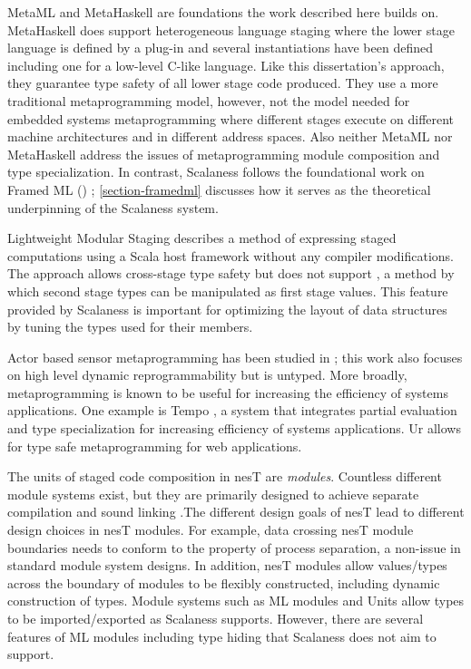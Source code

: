 MetaML \cite{Taha-MetaML,DBLP:conf/icess/Taha04} and MetaHaskell \cite{mainland12} are
foundations the work described here builds on. MetaHaskell does support heterogeneous language
staging where the lower stage language is defined by a plug-in and several instantiations have
been defined including one for a low-level C-like language. Like this dissertation's approach,
they guarantee type safety of all lower stage code produced. They use a more traditional
metaprogramming model, however, not the  model needed for embedded
systems metaprogramming where different stages execute on different machine architectures and in
different address spaces. Also neither MetaML nor MetaHaskell address the issues of
metaprogramming module composition and type specialization. In contrast, Scalaness follows the
foundational work on Framed ML (\fml) \cite{FramedML}; \autoref{section-framedml} discusses how
it serves as the theoretical underpinning of the Scalaness system.

Lightweight Modular Staging \cite{Rompf-LMS} describes a method of expressing staged
computations using a Scala host framework without any compiler modifications. The approach
allows cross-stage type safety but does not support , a
method by which second stage types can be manipulated as first stage values. This feature
provided by Scalaness is important for optimizing the layout of data structures by tuning the
types used for their members.

Actor based sensor metaprogramming has been studied in \cite{cheong07}; this work also focuses
on high level dynamic reprogrammability but is untyped. More broadly, metaprogramming is known
to be useful for increasing the efficiency of systems applications. One example is Tempo
\cite{289140}, a system that integrates partial evaluation and type specialization for
increasing efficiency of systems applications. Ur \cite{UrPLDI10} allows for type safe
metaprogramming for web applications.

The units of staged code composition in nesT are \emph{modules}. Countless different module
systems exist, but they are primarily designed to achieve separate compilation and sound linking
\cite{Cardelli-1997}.The different design goals of nesT lead to different design choices in nesT
modules. For example, data crossing nesT module boundaries needs to conform to the property of
process separation, a non-issue in standard module system designs. In addition, nesT modules
allow values/types across the boundary of modules to be flexibly constructed, including dynamic
construction of types. Module systems such as ML modules \cite{macqueen84} and Units
\cite{flatt98units} allow types to be imported/exported as Scalaness supports. However, there
are several features of ML modules including type hiding that Scalaness does not aim to support.

